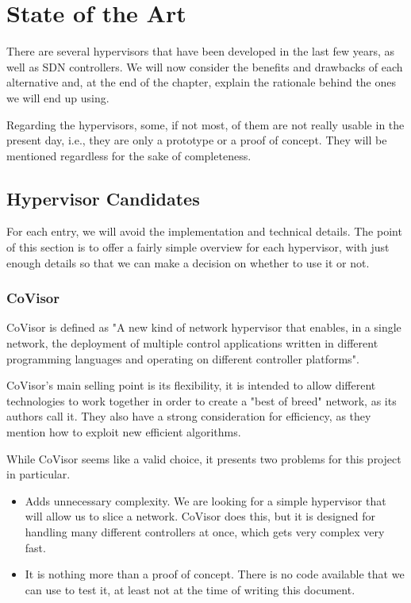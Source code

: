 \chapter{State of the Art} \label{chapter:state_of_the_art}
There are several hypervisors that have been developed in the last few years, as well as SDN controllers. We will now consider the benefits and drawbacks of each alternative and, at the end of the chapter, explain the rationale behind the ones we will end up using. 

Regarding the hypervisors, some, if not most, of them are not really usable in the present day, i.e., they are only a prototype or a proof of concept. They will be mentioned regardless for the sake of completeness.

\section{Hypervisor Candidates}
For each entry, we will avoid the implementation and technical details. The point of this section is to offer a fairly simple overview for each hypervisor, with just enough details so that we can make a decision on whether to use it or not.

\subsection{CoVisor}
CoVisor is defined as "A new kind of network hypervisor that enables, in a single network, the deployment of multiple control applications written in different programming languages and operating on different controller platforms"\cite{covisor}.

CoVisor's main selling point is its flexibility, it is intended to allow different technologies to work together in order to create a "best of breed" network, as its authors call it. They also have a strong consideration for efficiency, as they mention how to exploit new efficient algorithms.

While CoVisor seems like a valid choice, it presents two problems for this project in particular.
\begin{itemize}
    \item Adds unnecessary complexity. We are looking for a simple hypervisor that will allow us to slice a network. CoVisor does this, but it is designed for handling many different controllers at once, which gets very complex very fast.
    \item It is nothing more than a proof of concept. There is no code available that we can use to test it, at least not at the time of writing this document.
\end{itemize}


